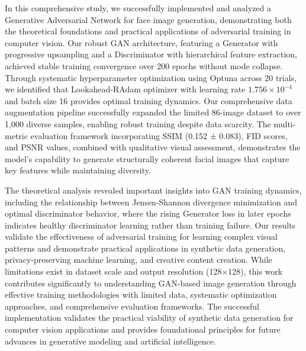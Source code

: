 \documentclass[a4paper, journal]{IEEEtran}
\begin{document}
In this comprehensive study, we successfully implemented and analyzed a Generative Adversarial Network for face image generation, demonstrating both the theoretical foundations and practical applications of adversarial training in computer vision. Our robust GAN architecture, featuring a Generator with progressive upsampling and a Discriminator with hierarchical feature extraction, achieved stable training convergence over 200 epochs without mode collapse. Through systematic hyperparameter optimization using Optuna across 20 trials, we identified that Lookahead-RAdam optimizer with learning rate $1.756 \times 10^{-4}$ and batch size 16 provides optimal training dynamics. Our comprehensive data augmentation pipeline successfully expanded the limited 86-image dataset to over 1,000 diverse samples, enabling robust training despite data scarcity. The multi-metric evaluation framework incorporating SSIM (0.152 ± 0.083), FID scores, and PSNR values, combined with qualitative visual assessment, demonstrates the model's capability to generate structurally coherent facial images that capture key features while maintaining diversity.

The theoretical analysis revealed important insights into GAN training dynamics, including the relationship between Jensen-Shannon divergence minimization and optimal discriminator behavior, where the rising Generator loss in later epochs indicates healthy discriminator learning rather than training failure. Our results validate the effectiveness of adversarial training for learning complex visual patterns and demonstrate practical applications in synthetic data generation, privacy-preserving machine learning, and creative content creation. While limitations exist in dataset scale and output resolution (128×128), this work contributes significantly to understanding GAN-based image generation through effective training methodologies with limited data, systematic optimization approaches, and comprehensive evaluation frameworks. The successful implementation validates the practical viability of synthetic data generation for computer vision applications and provides foundational principles for future advances in generative modeling and artificial intelligence.




\end{document}
